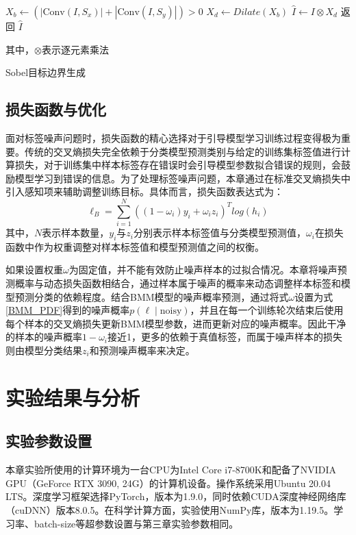 \begin{algorithm}[H]
    $ X_b\gets \left( \left| \text{Conv}\left( I,S_x \right) \right|+\left| \text{Conv}\left( I,S_y \right) \right| \right) >0 $ \;
    $X_d\gets Dilate(X_b)$ \;
    $\hat{I}\gets I\otimes X_d$ \;
    返回 $\hat{I}$ \;

    其中，$\otimes$表示逐元素乘法
    \caption{Sobel目标边界生成}
    \label{Sobel}
\end{algorithm}


\subsection{损失函数与优化}
面对标签噪声问题时，损失函数的精心选择对于引导模型学习训练过程变得极为重要。传统的交叉熵损失完全依赖于分类模型预测类别与给定的训练集标签值进行计算损失，对于训练集中样本标签存在错误时会引导模型参数拟合错误的规则，会鼓励模型学习到错误的信息。为了处理标签噪声问题，本章通过在标准交叉熵损失中引入感知项来辅助调整训练目标。具体而言，损失函数表达式为：
\begin{equation}
    \ell_B=\sum_{i=1}^{N}((1-\omega_i)y_i+\omega_iz_i)^Tlog(h_i)
\end{equation}
其中，$N$表示样本数量，$y_i$与$z_i$分别表示样本标签值与分类模型预测值，$\omega_i$在损失函数中作为权重调整对样本标签值和模型预测值之间的权衡。

如果设置权重$\omega$为固定值，并不能有效防止噪声样本的过拟合情况。本章将噪声预测概率与动态损失函数相结合，通过样本属于噪声的概率来动态调整样本标签和模型预测分类的依赖程度。结合BMM模型的噪声概率预测，通过将式$\omega$设置为式\ref{BMM_PDF}得到的噪声概率$p(\ell \mid \text{noisy})$，并且在每一个训练轮次结束后使用每个样本的交叉熵损失更新BMM模型参数，进而更新对应的噪声概率。因此干净的样本的噪声概率$1-\omega_i$接近1，更多的依赖于真值标签，而属于噪声样本的损失则由模型分类结果$z_i$和预测噪声概率来决定。

\section{实验结果与分析}
\subsection{实验参数设置}
本章实验所使用的计算环境为一台CPU为Intel Core i7-8700K和配备了NVIDIA GPU（GeForce RTX 3090, 24G）的计算机设备。操作系统采用Ubuntu 20.04 LTS。深度学习框架选择PyTorch，版本为1.9.0，同时依赖CUDA深度神经网络库（cuDNN）版本8.0.5。在科学计算方面，实验使用NumPy库，版本为1.19.5。学习率、batch-size等超参数设置与第三章实验参数相同。

